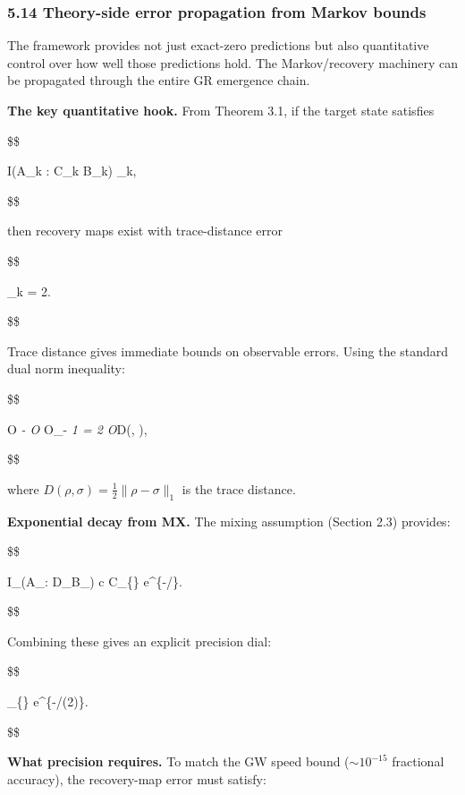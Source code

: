 \documentclass[11pt,a4paper]{article}
\theoremstyle{remark}
\begin{document}
\subsubsection{5.14 Theory-side error propagation from Markov bounds}\label{theory-side-error-propagation-from-markov-bounds}

The framework provides not just exact-zero predictions but also quantitative
control over how well those predictions hold. The Markov/recovery machinery
can be propagated through the entire GR emergence chain.

\textbf{The key quantitative hook.} From Theorem 3.1, if the target state satisfies

\$\$

I(A\_k : C\_k \mid B\_k) \le \varepsilon\_k,

\$\$

then recovery maps exist with trace-distance error

\$\$

\delta\_k = 2.

\$\$

Trace distance gives immediate bounds on observable errors. Using the
standard dual norm inequality:

\$\$

\textbar{}\langle O \rangle\emph{\rho - \langle O \rangle}\sigma\textbar{}
\le \textbar O\textbar\_\infty \textbar{}\rho - \sigma\textbar{}\emph{1 = 2 \textbar O\textbar{}}\infty D(\rho, \sigma),

\$\$

where \(D(\rho, \sigma) = \frac{1}{2}\|\rho - \sigma\|_1\) is the trace distance.

\textbf{Exponential decay from MX.} The mixing assumption (Section 2.3) provides:

\$\$

I\_\omega(A\_\delta : D\_\delta \mid B\_\delta)
\le c \cdot \textbar{}\partial C\textbar\_\{\} \cdot e\^{}\{-\delta/\xi\}.

\$\$

Combining these gives an explicit precision dial:

\$\$

\delta\_\{\} 
\cdot e\^{}\{-\delta/(2\xi)\}.

\$\$

\textbf{What precision requires.} To match the GW speed bound (\(\sim 10^{-15}\)
fractional accuracy), the recovery-map error must satisfy:
\end{document}

